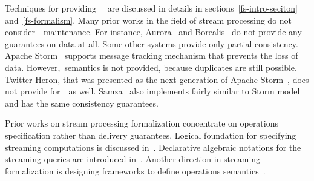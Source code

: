 
\label {fs-related-seciton}

Techniques for providing~\eo~\cite{Carbone:2017:SMA:3137765.3137777, Akidau:2013:MFS:2536222.2536229, Zaharia:2012:DSE:2342763.2342773} are discussed   in details in sections~\ref{fs-intro-seciton} and~\ref{fs-formalism}. Many prior works in the field of stream processing do not consider~\eo\ maintenance. 
For instance, Aurora~\cite{Abadi:2003:ANM:950481.950485} and Borealis~\cite{abadi2005design} do not provide any guarantees on data at all. Some other systems provide only partial consistency. Apache Storm~\cite{apache:storm} supports message tracking mechanism that prevents the loss of data. 
However,\eo\ semantics is not provided, because duplicates are still possible. Twitter Heron, that was presented as the next generation of Apache Storm~\cite{Kulkarni:2015:THS:2723372.2742788}, does not provide for~\eo\ as well. 
Samza~\cite{Noghabi:2017:SSS:3137765.3137770} also implements fairly similar to Storm model and has the same consistency guarantees.

Prior works on stream processing formalization concentrate on operations specification rather than delivery guarantees. Logical foundation for specifying streaming computations is discussed in~\cite{alur2018interfaces}. Declarative algebraic notations for the streaming queries are introduced in~\cite{halle2014formalization}. Another direction in streaming formalization is designing frameworks to define operations semantics~\cite{beck2018lars}.